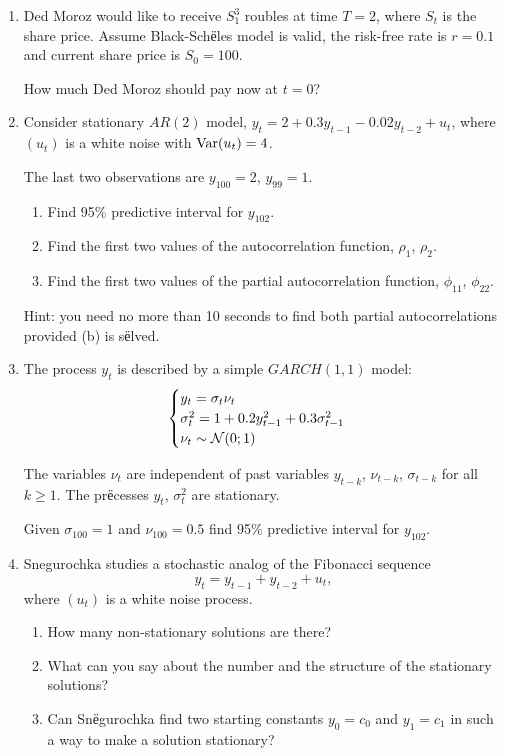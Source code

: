 \begin{enumerate}

    \item Ded Moroz would like to receive $S_1^3$ roubles at time $T=2$,
    where $S_t$ is the share price. Assume Black-Schёles model is valid, 
    the risk-free rate is $r=0.1$ and current share price is $S_0=100$.

    How much Ded Moroz should pay now at $t=0$?
    
    \item Consider stationary $AR(2)$ model, $y_t = 2 + 0.3 y_{t-1} - 0.02 y_{t-2} + u_t$, where $(u_t)$ is a white noise
    with $\operatorname{Var}(u_t) = 4$.
    
    The last two observations are $y_{100} = 2$, $y_{99} = 1$.
    \begin{enumerate}
        \item Find 95\% predictive interval for $y_{102}$.
        \item Find the first two values of the autocorrelation function, $\rho_1$, $\rho_2$.
        \item Find the first two values of the partial autocorrelation function, $\phi_{11}$, $\phi_{22}$.
    \end{enumerate}

    Hint: you need no more than 10 seconds to find both partial autocorrelations provided (b) is sёlved.

    \item The process $y_t$ is described by a simple $GARCH(1, 1)$ model:
    \[ 
        \begin{cases}
            y_t = \sigma_t \nu_t \\
            \sigma_{t}^{2}= 1 + 0.2 y_{t-1}^{2}+ 0.3 \sigma_{t-1}^{2}    \\
            \nu_t \sim \mathcal{N}(0;1)
        \end{cases}     
    \]

    The variables $\nu_t$ are independent of past variables $y_{t-k}$, $\nu_{t-k}$, $\sigma_{t-k}$ for all $k\geq 1$.
    The prёcesses $y_t$, $\sigma^2_t$ are stationary. 


    Given $\sigma_{100}=1$ and $\nu_{100} = 0.5$ find 95\% predictive interval for $y_{102}$. 


    \item Snegurochka studies a stochastic analog of the Fibonacci sequence
    \[
        y_t = y_{t-1} + y_{t-2} + u_t,
    \]
    where $(u_t)$ is a white noise process. 
    \begin{enumerate}
        \item How many non-stationary solutions are there?
        \item What can you say about the number and the structure of the stationary solutions?
        \item Can Snёgurochka find two starting constants $y_0 = c_0$ and $y_1=c_1$ in such a way to make a solution stationary?
    \end{enumerate}


\end{enumerate}
